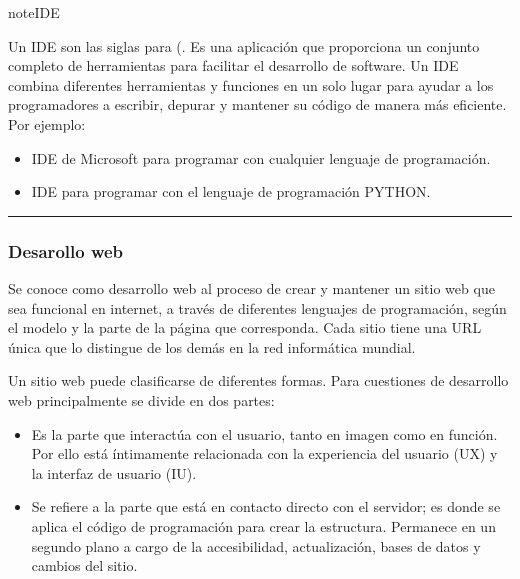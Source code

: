\documentclass[letterpaper,10pt,spanish]{sphinxmanual}
\begin{document}
\begin{sphinxadmonition}{note}{IDE}

\sphinxAtStartPar
Un IDE son las siglas para (. Es una aplicación que proporciona un conjunto completo de herramientas para facilitar el desarrollo de software. Un IDE combina diferentes herramientas y funciones en un solo lugar para ayudar a los programadores a escribir, depurar y mantener su código de manera más eficiente. Por ejemplo:
\begin{itemize}
\item {} 
\sphinxAtStartPar
{} IDE de Microsoft para programar con cualquier lenguaje de programación.

\item {} 
\sphinxAtStartPar
{} IDE para programar con el lenguaje de programación PYTHON.

\end{itemize}
\end{sphinxadmonition}


\bigskip\hrule\bigskip



\subsubsection{Desarollo web}
\label{\detokenize{1_guias/10programacion/G1021:desarollo-web}}
\sphinxAtStartPar
Se conoce como desarrollo web al proceso de crear y mantener un sitio web que sea funcional en internet, a través de diferentes lenguajes de programación, según el modelo y la parte de la página que corresponda. Cada sitio tiene una URL única que lo distingue de los demás en la red informática mundial.

\sphinxAtStartPar
Un sitio web puede clasificarse de diferentes formas. Para cuestiones de desarrollo web principalmente se divide en dos partes:
\begin{itemize}
\item {} 
\sphinxAtStartPar
{} Es la parte que interactúa con el usuario, tanto en imagen como en función. Por ello está íntimamente relacionada con la experiencia del usuario (UX) y la interfaz de usuario (IU).

\item {} 
\sphinxAtStartPar
{} Se refiere a la parte que está en contacto directo con el servidor; es donde se aplica el código de programación para crear la estructura. Permanece en un segundo plano a cargo de la accesibilidad, actualización, bases de datos y cambios del sitio.

\end{itemize}
\end{document}
